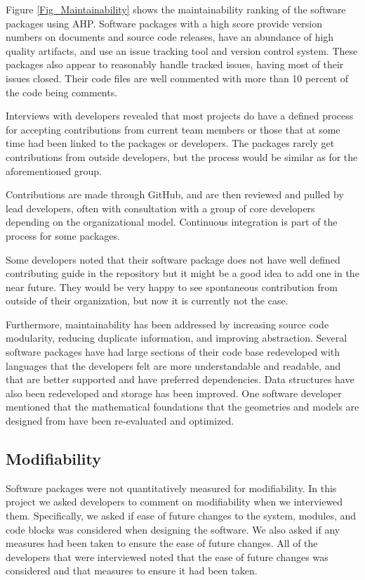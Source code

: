 \documentclass[12pt, notitlepage]{article}
\begin{document}
Figure \ref{Fig_Maintainability} shows the maintainability ranking of the software packages using AHP. Software packages with a high score provide version numbers on documents and source code releases, have an abundance of high quality artifacts, and use an issue tracking tool and version control system. These packages also appear to reasonably handle tracked issues, having most of their issues closed. Their code files are well commented with more than 10 percent of the code being comments. 

Interviews with developers revealed that most projects do have a defined process for accepting contributions from current team members or those that at some time had been linked to the packages or developers. The packages rarely get contributions from outside developers, but the process would be similar as for the aforementioned group.

Contributions are made through GitHub, and are then reviewed and pulled by lead developers, often with consultation with a group of core developers depending on the organizational model. Continuous integration is part of the process for some packages. 

Some developers noted that their software package does not have well defined contributing guide in the repository but it might be a good idea to add one in the near future. They would be very happy to see spontaneous contribution from outside of their organization, but now it is currently not the case.

Furthermore, maintainability has been addressed by increasing source code modularity, reducing duplicate information, and improving abstraction. Several software packages have had large sections of their code base redeveloped with languages that the developers felt are more understandable and readable, and that are better supported and have preferred dependencies. Data structures have also been redeveloped and storage has been improved. One software developer mentioned that the mathematical foundations that the geometries and models are designed from have been re-evaluated and optimized. 

\subsection{Modifiability}

Software packages were not quantitatively measured for modifiability.
In this project we asked developers to comment on modifiability when we interviewed them. Specifically, we asked if ease of future changes to the system, modules, and code blocks was considered when designing the software. We also asked if any measures had been taken to ensure the ease of future changes. 
All of the developers that were interviewed noted that the ease of future changes was considered and that measures to ensure it had been taken.
\end{document}
